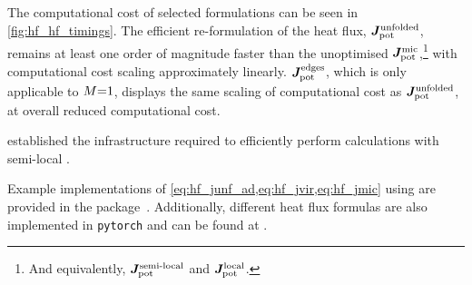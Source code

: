 The computational cost of selected formulations can be seen in \cref{fig:hf_hf_timings}. 
The efficient re-formulation of the heat flux, $\boldsymbol{J}^{\text{unfolded}}_\text{pot}$, remains at least one order of magnitude faster than the unoptimised $\boldsymbol{J}^{\text{mic}}_\text{pot}$,\footnote{And equivalently, $\boldsymbol{J}^{\text{semi-local}}_\text{pot}$ and $\boldsymbol{J}^{\text{local}}_\text{pot}$.} with computational cost scaling approximately linearly. 
$\boldsymbol{J}^{\text{edges}}_\text{pot}$, which is only applicable to $M{=}1$, displays the same scaling of computational cost as $\boldsymbol{J}^{\text{unfolded}}_\text{pot}$, at overall reduced computational cost.


 established the infrastructure required to efficiently perform \gk calculations with semi-local \glps.

\vspace*{\fill}
\noindent
Example implementations of \cref{eq:hf_junf_ad,eq:hf_jvir,eq:hf_jmic} using \jax are provided in the \glpc package~\cite{glp}.
Additionally, different heat flux formulas are also implemented in \texttt{pytorch} and can be found at .
